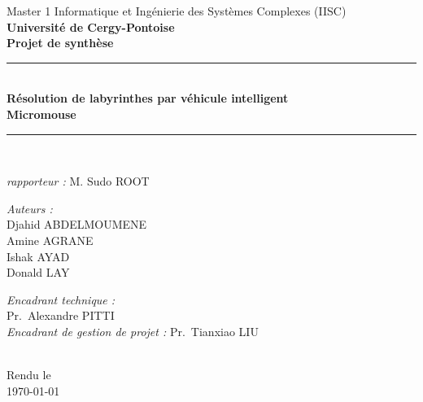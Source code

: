 \begin{titlepage}

\begin{center}

\AddToShipoutPicture*{\BackgroundPic}

{\large Master 1 Informatique et Ingénierie des Systèmes Complexes (IISC)}\\[0.5cm]

{\large \textbf{Université de Cergy-Pontoise}}\\[1.5cm]

{\large \textbf{Projet de synthèse}}\\[0.5cm]

\rule{\linewidth}{0.5mm} \\[0.4cm]
{ 
    \huge \bfseries Résolution de labyrinthes par véhicule intelligent \\[0.5cm]
    \huge Micromouse\\[0.4cm]
}
\rule{\linewidth}{0.5mm} \\[0.5cm]

\begin{center}
\begin{minipage}{0.5\textwidth}
   \large
    \emph{rapporteur :}
    M. Sudo \textsc{ROOT}
\end{minipage}%
\end{center}

\vspace{5mm}
\noindent
\begin{minipage}{0.5\textwidth}
  \begin{flushleft} \large
    \emph{Auteurs :}\\
    Djahid \textsc{ABDELMOUMENE}\\
    Amine \textsc{AGRANE}\\
    Ishak \textsc{AYAD}\\
    Donald \textsc{LAY}
  \end{flushleft}
\end{minipage}%
\begin{minipage}{0.5\textwidth}
  \begin{flushright} \large
    \emph{Encadrant technique :} \\
    Pr.~Alexandre \textsc{PITTI}\\
    \emph{Encadrant de gestion de projet :}
    Pr.~Tianxiao \textsc{LIU}
  \end{flushright}
\end{minipage}

 \\

\vspace*{\fill}
{\large Rendu le\\ \today}

\end{center}
\end{titlepage}
